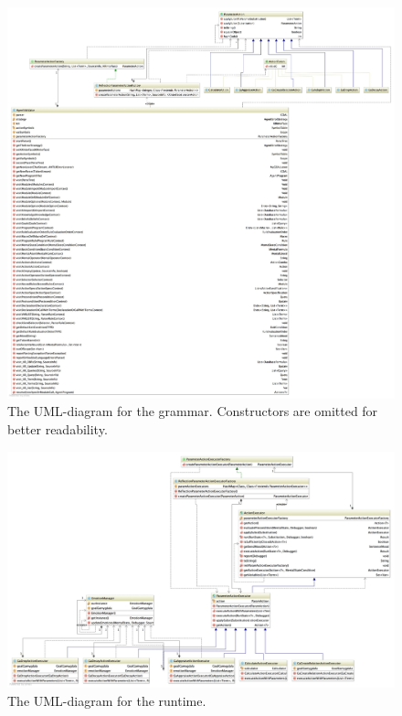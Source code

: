 \begin{figure}
\includegraphics[width=\linewidth]{diagram-grammar}
\caption{The UML-diagram for the grammar. Constructors are omitted for better readability.}
\end{figure}

\begin{figure}
\includegraphics[width=\linewidth]{diagram-runtime}
\caption{The UML-diagram for the runtime.}
\end{figure}